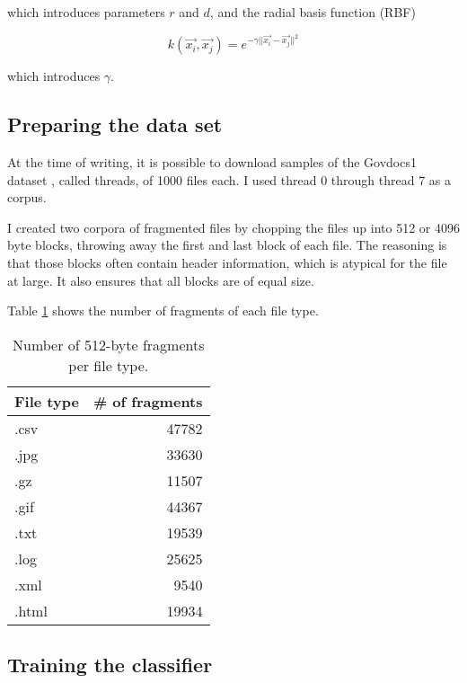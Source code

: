 which introduces parameters $r$ and $d$, and the radial basis
function (RBF)

$$ k(\vec{x_{i}}, \vec{x_{j}}) = e^{-\gamma ||\vec{x_{i}}
- \vec{x_{j}}||^{2}} $$

which introduces $\gamma$.

\subsection{Preparing the data set}


At the time of writing, it is possible to download samples of the Govdocs1
dataset \cite{Garfinkel2009}, called threads, of 1000 files each. I used
thread 0 through thread 7 as a corpus.

I created two corpora of fragmented files by chopping the files up into 512 or
4096 byte blocks, throwing away the first and last block of each file. The
     reasoning is that those blocks often contain header information, which is
     atypical for the file at large. It also ensures that all blocks are of
     equal size.

Table \ref{table:number_of_fragments} shows the number of fragments of each file type.

\begin{table}
\begin{tabular}{lr}
\hline
 File type   &   \# of fragments \\
\hline
 .csv        &                 47782 \\
 .jpg        &                 33630 \\
 .gz         &                 11507 \\
 .gif        &                 44367 \\
 .txt        &                 19539 \\
 .log        &                 25625 \\
 .xml        &                 9540  \\
 .html       &                 19934  \\
\hline
\end{tabular}
\caption{Number of 512-byte fragments per file type.}
\label{table:number_of_fragments}
\end{table}



\subsection{Training the classifier}

